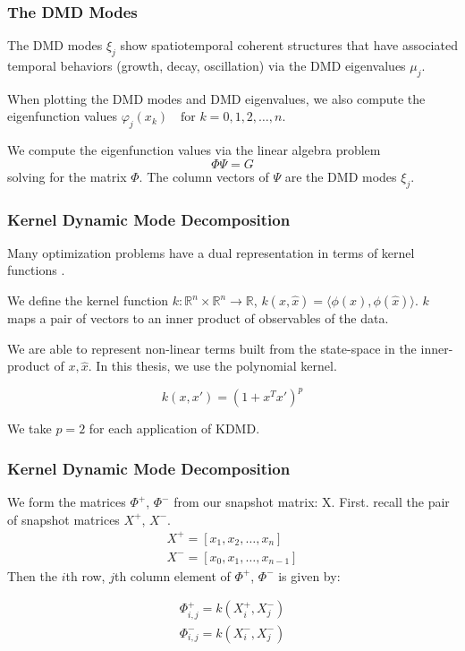 \documentclass{beamer}
\begin{document}
\begin{frame}
    \frametitle{The DMD Modes}
    The DMD modes $\xi_j$ show spatiotemporal coherent structures that have associated temporal behaviors (growth, decay, oscillation)
    via the DMD eigenvalues $\mu_j$.

    \vspace{3mm}
    
    When plotting the DMD modes and DMD eigenvalues, we also compute the
     eigenfunction values $\varphi_j(x_k) \quad \text{for } k=0,1,2,\dots,n$. 

    \vspace{3mm}

    We compute the eigenfunction values via the linear algebra problem 
    $$\varPhi \Psi = G$$
     solving for the matrix $\varPhi$. The column vectors of $\Psi$
    are the DMD modes $\xi_j$.

\end{frame}


\begin{frame}
    \frametitle{Kernel Dynamic Mode Decomposition}
    Many optimization problems have a dual representation in terms of kernel functions \cite{williams2015kernelbased}.

    \begin{definition}
        We define the kernel function $k:\mathbb{R}^n \times \mathbb{R}^n \rightarrow \mathbb{R}$, $ k(x,{\hat x}) = \langle \phi(x), \phi({\hat x})\rangle$.
        $k$ maps a pair of vectors to an inner product of observables of the data.
    \end{definition}

    We are able to represent non-linear terms built from the state-space in the inner-product of $x, {\hat x}$. In
    this thesis, we use the polynomial kernel.

    $$
    k(x,x') = (1 + x^Tx')^p
    $$

    We take $p=2$ for each application of KDMD.
\end{frame}
\begin{frame}
    \frametitle{Kernel Dynamic Mode Decomposition}
    We form the matrices $\Phi^{+}$, $\Phi^{-}$ from our snapshot matrix: X.
    First. recall the pair of snapshot matrices $X^{+}$, $X^{-}$.
    \begin{align*}
        X^{+} = [x_1,x_2,\dots,x_n]\\
        X^{-} = [x_0,x_1,\dots,x_{n-1}]
    \end{align*}
    Then the $i$th row, $j$th column element of $\Phi^{+}$, $\Phi^{-}$ is given by:

    \begin{align*}
        \Phi^{+}_{i,j} = k(X^{+}_i,X^{-}_j)\\
        \Phi^{-}_{i,j}= k(X^{-}_i,X^{-}_j)
    \end{align*}
\end{frame}
\end{document}
